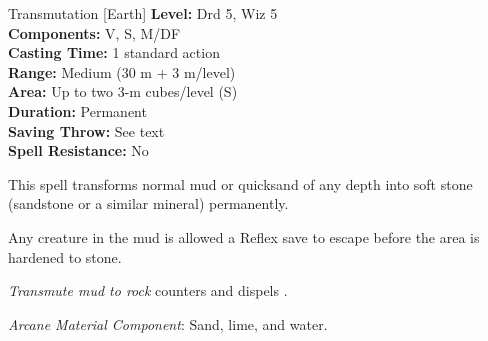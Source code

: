 {Transmutation [Earth]}
{
	\textbf{Level:}
	Drd 5, Wiz 5\\
	\textbf{Components:}
	V, S, M/DF\\
	\textbf{Casting Time:}
	1 standard action\\
	\textbf{Range:}
	Medium (30 m + 3 m/level)\\
	\textbf{Area:}
	Up to two 3-m cubes/level (S)\\
	\textbf{Duration:}
	Permanent\\
	\textbf{Saving Throw:}
	See text\\
	\textbf{Spell Resistance:}
	No\\
}
{
	This spell transforms normal mud or quicksand of any depth into soft stone (sandstone or a similar mineral) permanently.

	Any creature in the mud is allowed a Reflex save to escape before the area is hardened to stone.

	\emph{Transmute mud to rock} counters and dispels .

	\textit{Arcane Material Component}:
	Sand, lime, and water.

}
